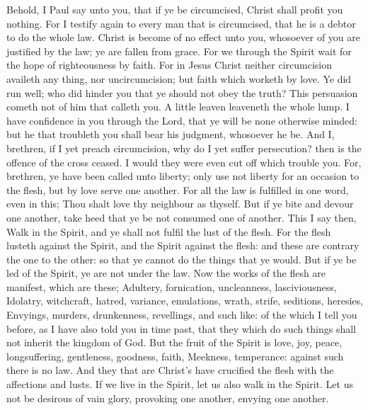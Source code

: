  Behold, I Paul say unto you, that if ye be circumcised,
Christ shall profit you nothing.  For I testify again to
every man that is circumcised, that he is a debtor to do the whole law.
 Christ is become of no effect unto you, whosoever of you
are justified by the law; ye are fallen from grace.  For we
through the Spirit wait for the hope of righteousness by faith.
 For in Jesus Christ neither circumcision availeth any
thing, nor uncircumcision; but faith which worketh by love. 
Ye did run well; who did hinder you that ye should not obey the truth?
 This persuasion cometh not of him that calleth you.
 A little leaven leaveneth the whole lump.  I
have confidence in you through the Lord, that ye will be none otherwise
minded: but he that troubleth you shall bear his judgment, whosoever he
be.  And I, brethren, if I yet preach circumcision, why do
I yet suffer persecution? then is the offence of the cross ceased.
 I would they were even cut off which trouble you.
 For, brethren, ye have been called unto liberty; only use
not liberty for an occasion to the flesh, but by love serve one another.
 For all the law is fulfilled in one word, even in this;
Thou shalt love thy neighbour as thyself.  But if ye bite
and devour one another, take heed that ye be not consumed one of
another.  This I say then, Walk in the Spirit, and ye shall
not fulfil the lust of the flesh.  For the flesh lusteth
against the Spirit, and the Spirit against the flesh: and these are
contrary the one to the other: so that ye cannot do the things that ye
would.  But if ye be led of the Spirit, ye are not under
the law.  Now the works of the flesh are manifest, which
are these; Adultery, fornication, uncleanness, lasciviousness,
 Idolatry, witchcraft, hatred, variance, emulations, wrath,
strife, seditions, heresies,  Envyings, murders,
drunkenness, revellings, and such like: of the which I tell you before,
as I have also told you in time past, that they which do such things
shall not inherit the kingdom of God.  But the fruit of the
Spirit is love, joy, peace, longsuffering, gentleness, goodness, faith,
 Meekness, temperance: against such there is no law.
 And they that are Christ's have crucified the flesh with
the affections and lusts.  If we live in the Spirit, let us
also walk in the Spirit.  Let us not be desirous of vain
glory, provoking one another, envying one another.

